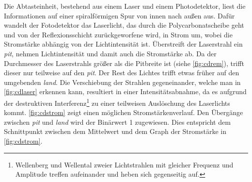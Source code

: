 Die Abtasteinheit, bestehend aus einem Laser und einem Photodetektor, liest die
Informationen auf einer spiralförmigen Spur von innen nach außen aus. Dafür
wandelt der Fotodetektor das Laserlicht, das durch die Polycarbonatscheibe geht
und von der Reflexionsschicht zurückgeworfene wird, in Strom um, wobei die
Stromstärke abhängig von der Lichtintensität ist. Überstreift der Laserstrahl
ein \textit{pit}, nehmen Lichtintensität und damit auch die Stromstärke ab. Da
der Durchmesser des Laserstrahls größer als die Pitbreite ist (siehe
\autoref{fig:cdrem}), trifft dieser nur teilweise auf den \textit{pit}. Der Rest
des Lichtes trifft etwas früher auf den umgebenden \textit{land}. Die
Verschiebung der Strahlen gegeneinander, welche man in \autoref{fig:cdlaser}
erkennen kann, resultiert in einer Intensitätsabnahme, da es aufgrund der
destruktiven Interferenz\footnote{Wellenberg und Wellental zweier Lichtstrahlen
mit gleicher Frequenz und Amplitude treffen aufeinander und heben sich
gegenseitig auf.} zu einer teilweisen Auslöschung des Laserlichts kommt.
\autoref{fig:cdstrom} zeigt einen möglichen Stromstärkenverlauf. Den Übergänge
zwischen \textit{pit} und \textit{land} wird der Binärwert 1 zugewiesen. Dies
entspricht dem Schnittpunkt zwischen dem Mittelwert und dem Graph der
Stromstärke in \autoref{fig:cdstrom}. \cite{cdp}

